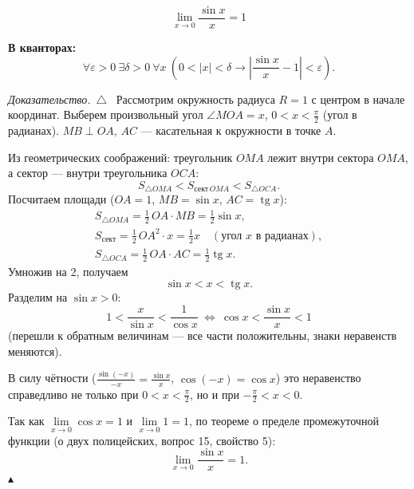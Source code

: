 \documentclass[a4paper,11pt]{article}
\newcommand{\eps}{\varepsilon}
\DeclareMathOperator{\tg}{tg}
\newcommand{\kv}{\par\noindent\textbf{\textcolor{oprc!85!black}{В кванторах:}}}
\newenvironment{dok}
  {\par\smallskip\noindent\textit{Доказательство.}\ $\triangle$\ \ignorespaces}
  {\unskip\nobreak\hfill$\blacktriangle$\par\smallskip}
\begin{document}
\begin{teo}
\[
  \boxed{\lim_{x \to 0} \frac{\sin x}{x} = 1}
\]
\kv
\[
  \forall \eps > 0\ \exists \delta > 0\ \forall x\ \left(0 < |x| < \delta \to \left|\frac{\sin x}{x} - 1\right| < \eps\right).
\]
\end{teo}

\begin{dok}
Рассмотрим окружность радиуса $R = 1$ с центром в начале координат. Выберем произвольный угол $\angle MOA = x$, $0 < x < \frac{\pi}{2}$
(угол в радианах). $MB \perp OA$, $AC$ --- касательная к окружности в точке $A$.

\begin{center}
\end{center}

Из геометрических соображений: треугольник $OMA$ лежит внутри сектора $OMA$, а сектор --- внутри треугольника $OCA$:
\[
  S_{\triangle OMA} < S_{\text{сект}\,OMA} < S_{\triangle OCA}.
\]
Посчитаем площади ($OA = 1$, $MB = \sin x$, $AC = \tg x$):
\begin{gather*}
  S_{\triangle OMA} = \frac{1}{2}\, OA \cdot MB = \frac{1}{2} \sin x, \\
  S_{\text{сект}} = \frac{1}{2}\, OA^2 \cdot x = \frac{1}{2} x
  \quad (\text{угол } x \text{ в радианах}), \\
  S_{\triangle OCA} = \frac{1}{2}\, OA \cdot AC = \frac{1}{2} \tg x.
\end{gather*}
Умножив на 2, получаем
\[
  \sin x < x < \tg x.
\]
Разделим на $\sin x > 0$:
\[
  1 < \frac{x}{\sin x} < \frac{1}{\cos x}
  \ \Longleftrightarrow\ \cos x < \frac{\sin x}{x} < 1
\]
(перешли к обратным величинам --- все части положительны, знаки неравенств меняются).

В силу чётности ($\frac{\sin(-x)}{-x} = \frac{\sin x}{x}$, $\cos(-x) = \cos x$) это неравенство справедливо не только при
$0 < x < \frac{\pi}{2}$, но и при $-\frac{\pi}{2} < x < 0$.

Так как $\lim\limits_{x \to 0} \cos x = 1$ и $\lim\limits_{x \to 0} 1 = 1$, по теореме о пределе промежуточной функции (о двух полицейских,
вопрос 15, свойство 5):
\[
  \lim_{x \to 0} \frac{\sin x}{x} = 1.
\]
\end{dok}
\end{document}
